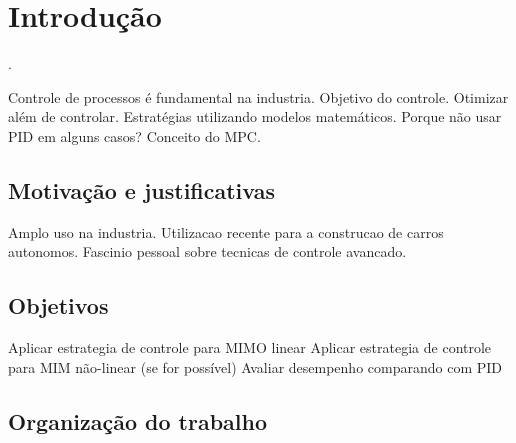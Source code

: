 \chapter{Introdução}

.

Controle de processos é fundamental na industria.
Objetivo do controle.
Otimizar além de controlar.
Estratégias utilizando modelos matemáticos.
Porque não usar PID em alguns casos?
Conceito do MPC.

\section{Motivação e justificativas}

Amplo uso na industria.
Utilizacao recente para a construcao de carros autonomos.
Fascinio pessoal sobre tecnicas de controle avancado.

\section{Objetivos}

Aplicar estrategia de controle para MIMO linear
Aplicar estrategia de controle para MIM não-linear (se for possível)
Avaliar desempenho comparando com PID

\section{Organização do trabalho}